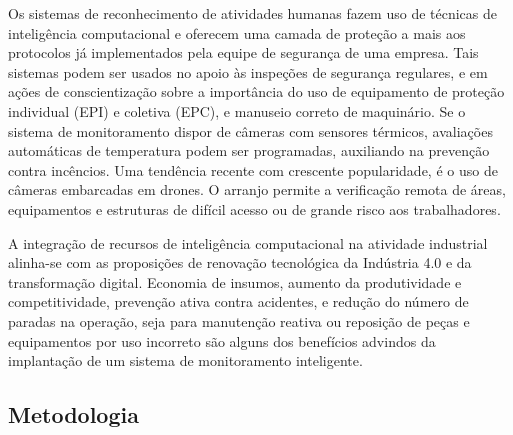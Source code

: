 Os sistemas de reconhecimento de atividades humanas fazem uso de técnicas de inteligência computacional e oferecem uma camada de proteção a mais aos protocolos já implementados pela equipe de segurança de uma empresa. Tais sistemas podem ser usados no apoio às inspeções de segurança regulares, e em ações de conscientização sobre a importância do uso de equipamento de proteção individual (EPI) e coletiva (EPC), e manuseio correto de maquinário. Se o sistema de monitoramento dispor de câmeras com sensores térmicos, avaliações automáticas de temperatura podem ser programadas, auxiliando na prevenção contra incêncios. Uma tendência recente com crescente popularidade, é o uso de câmeras embarcadas em drones. O arranjo permite a verificação remota de áreas, equipamentos e estruturas de difícil acesso ou de grande risco aos trabalhadores.

A integração de recursos de inteligência computacional na atividade industrial alinha-se com as proposições de renovação tecnológica da Indústria 4.0 e da transformação digital. Economia de insumos, aumento da produtividade e competitividade, prevenção ativa contra acidentes, e redução do número de paradas na operação, seja para manutenção reativa ou reposição de peças e equipamentos por uso incorreto são alguns dos benefícios advindos da implantação de um sistema de monitoramento inteligente. 

\subsection{Metodologia}
\label{ssec:metod}

